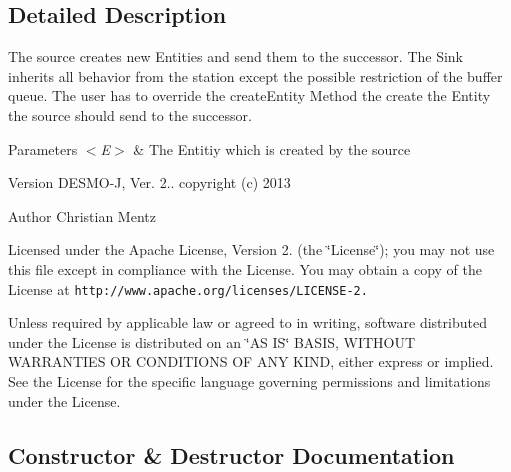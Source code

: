 \subsection{Detailed Description}
The source creates new Entities and send them to the successor. The Sink inherits all behavior from the station except the possible restriction of the buffer queue. The user has to override the create\-Entity Method the create the Entity the source should send to the successor.


\begin{DoxyParams}{Parameters}
{\em $<$\-E$>$} & The Entitiy which is created by the source\\
\hline
\end{DoxyParams}
\begin{DoxyVersion}{Version}
D\-E\-S\-M\-O-\/\-J, Ver. 2.. copyright (c) 2013 
\end{DoxyVersion}
\begin{DoxyAuthor}{Author}
Christian Mentz
\end{DoxyAuthor}
Licensed under the Apache License, Version 2. (the \char`\"{}\-License\char`\"{}); you may not use this file except in compliance with the License. You may obtain a copy of the License at {\tt http\-://www.\-apache.\-org/licenses/\-L\-I\-C\-E\-N\-S\-E-\/2.}

Unless required by applicable law or agreed to in writing, software distributed under the License is distributed on an \char`\"{}\-A\-S I\-S\char`\"{} B\-A\-S\-I\-S, W\-I\-T\-H\-O\-U\-T W\-A\-R\-R\-A\-N\-T\-I\-E\-S O\-R C\-O\-N\-D\-I\-T\-I\-O\-N\-S O\-F A\-N\-Y K\-I\-N\-D, either express or implied. See the License for the specific language governing permissions and limitations under the License. 

\subsection{Constructor \& Destructor Documentation}
